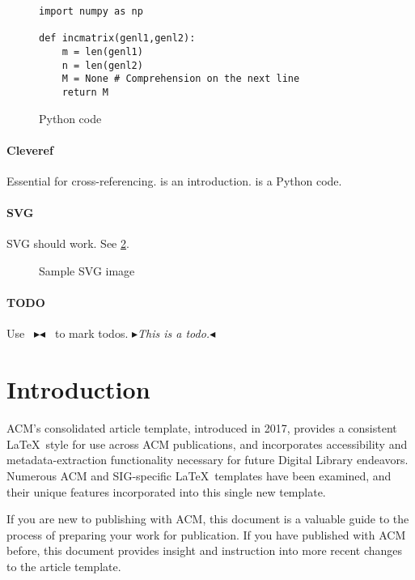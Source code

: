 \documentclass[acmsmall,natbib=false]{acmart}
\newcommand{\todo}[1]
   {{\color{red} \fbox{\bfseries\sffamily\scriptsize{TODO}}
   {\small$\blacktriangleright$\textsf{\emph{#1}}$\blacktriangleleft$}}~}
\begin{document}
\begin{figure}
    \begin{verbatim}
import numpy as np
    
def incmatrix(genl1,genl2):
    m = len(genl1)
    n = len(genl2)
    M = None # Comprehension on the next line
    return M
    \end{verbatim}
    \caption{Python code}
    \label{fig:python}
\end{figure}

\paragraph{Cleveref} Essential for cross-referencing.  is an introduction.  is a Python code.

\paragraph{SVG} SVG should work. See \cref{fig:svg-sample}.

\begin{figure}
    \centering
    
    \caption{Sample SVG image}
    \label{fig:svg-sample}
\end{figure}

\paragraph{TODO} Use \texttt{\todo{}} to mark todos. \todo{This is a todo.}

\section{Introduction}
\label{sec:intro}
ACM's consolidated article template, introduced in 2017, provides a
consistent \LaTeX\ style for use across ACM publications, and
incorporates accessibility and metadata-extraction functionality
necessary for future Digital Library endeavors. Numerous ACM and
SIG-specific \LaTeX\ templates have been examined, and their unique
features incorporated into this single new template.

If you are new to publishing with ACM, this document is a valuable
guide to the process of preparing your work for publication. If you
have published with ACM before, this document provides insight and
instruction into more recent changes to the article template.
\end{document}
